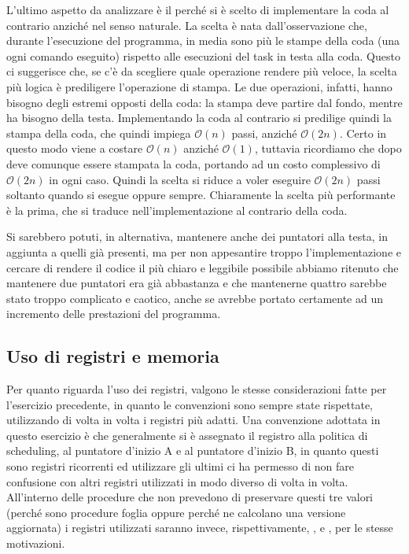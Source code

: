         L'ultimo aspetto da analizzare è il perché si è scelto di implementare la coda al contrario anziché nel senso naturale. La scelta è nata dall'osservazione che, durante l'esecuzione del programma, in media sono più le stampe della coda (una ogni comando eseguito) rispetto alle esecuzioni del task in testa alla coda. Questo ci suggerisce che, se c'è da scegliere quale operazione rendere più veloce, la scelta più logica è prediligere l'operazione di stampa. Le due operazioni, infatti, hanno bisogno degli estremi opposti della coda: la stampa deve partire dal fondo, mentre  ha bisogno della testa. Implementando la coda al contrario si predilige quindi la stampa della coda, che quindi impiega $\mathcal{O}(n)$ passi, anziché $\mathcal{O}(2n)$. Certo in questo modo  viene a costare $\mathcal{O}(n)$ anziché $\mathcal{O}(1)$, tuttavia ricordiamo che dopo  deve comunque essere stampata la coda, portando ad un costo complessivo di $\mathcal{O}(2n)$ in ogni caso. Quindi la scelta si riduce a voler eseguire $\mathcal{O}(2n)$ passi soltanto quando si esegue  oppure sempre. Chiaramente la scelta più performante è la prima, che si traduce nell'implementazione al contrario della coda.
        
        Si sarebbero potuti, in alternativa, mantenere anche dei puntatori alla testa, in aggiunta a quelli già presenti, ma per non appesantire troppo l'implementazione e cercare di rendere il codice il più chiaro e leggibile possibile abbiamo ritenuto che mantenere due puntatori era già abbastanza e che mantenerne quattro sarebbe stato troppo complicato e caotico, anche se avrebbe portato certamente ad un incremento delle prestazioni del programma.
    
    \subsection*{Uso di registri e memoria}
    
        Per quanto riguarda l'uso dei registri, valgono le stesse considerazioni fatte per l'esercizio precedente, in quanto le convenzioni sono sempre state rispettate, utilizzando di volta in volta i registri più adatti. Una convenzione adottata in questo esercizio è che generalmente si è assegnato il registro  alla politica di scheduling,  al puntatore d'inizio A e  al puntatore d'inizio B, in quanto questi sono registri ricorrenti ed utilizzare gli ultimi ci ha permesso di non fare confusione con altri registri utilizzati in modo diverso di volta in volta. All'interno delle procedure che non prevedono di preservare questi tre valori (perché sono procedure foglia oppure perché ne calcolano una versione aggiornata) i registri utilizzati saranno invece, rispettivamente, ,   e , per le stesse motivazioni.
        

